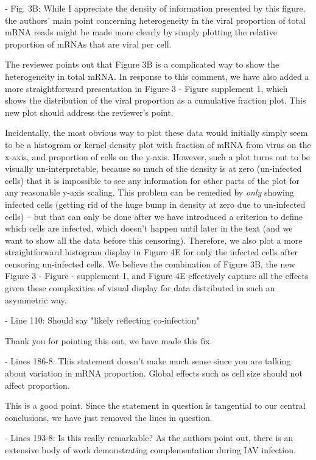 \documentclass[11pt, oneside]{article}   	%
\begin{document}
- Fig. 3B: While I appreciate the density of information presented by this figure, the authors' main point concerning heterogeneity in the viral proportion of total mRNA reads might be made more clearly by simply plotting the relative proportion of mRNAs that are viral per cell. 

{\color{black}
The reviewer points out that Figure 3B is a complicated way to show the heterogeneity in total mRNA.
In response to this comment, we have also added a more straightforward presentation in Figure 3 - Figure supplement 1, which shows the distribution of the viral proportion as a cumulative fraction plot.
This new plot should address the reviewer's point.

Incidentally, the most obvious way to plot these data would initially simply seem to be a histogram or kernel density plot with fraction of mRNA from virus on the x-axis, and proportion of cells on the y-axis.
However, such a plot turns out to be visually un-interpretable, because so much of the density is at zero (un-infected cells) that it is impossible to see any information for other parts of the plot for any reasonable y-axis scaling. 
This problem can be remedied by \emph{only} showing infected cells (getting rid of the huge bump in density at zero due to un-infected cells) -- but that can only be done after we have introduced a criterion to define which cells are infected, which doesn't happen until later in the text (and we want to show all the data before this censoring).
Therefore, we also plot a more straightforward histogram display in Figure 4E for only the infected cells after censoring un-infected cells.
We believe the combination of Figure 3B, the new Figure 3 - Figure - supplement 1, and Figure 4E effectively capture all the effects given these complexities of visual display for data distributed in such an asymmetric way.
}

- Line 110: Should say "likely reflecting co-infection" 

{\color{black}
Thank you for pointing this out, we have made this fix.}

- Lines 186-8: This statement doesn't make much sense since you are talking about variation in mRNA proportion. Global effects such as cell size should not affect proportion. 

{\color{black}
This is a good point. 
Since the statement in question is tangential to our central conclusions, we have just removed the lines in question.
}

- Lines 193-8: Is this really remarkable? As the authors point out, there is an extensive body of work demonstrating complementation during IAV infection. 
\end{document}
